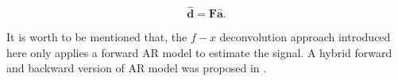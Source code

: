 \begin{equation}
\label{eq:solution1}
\hat{\mathbf{d}}= \mathbf{F}\hat{\mathbf{a}}.
\end{equation}

It is worth to be mentioned that, the $f-x$ deconvolution approach introduced here only applies a forward AR model to estimate the signal. A hybrid forward and backward version of AR model was proposed in \cite{yanghua1999}.



\newpage
\listoffigures









